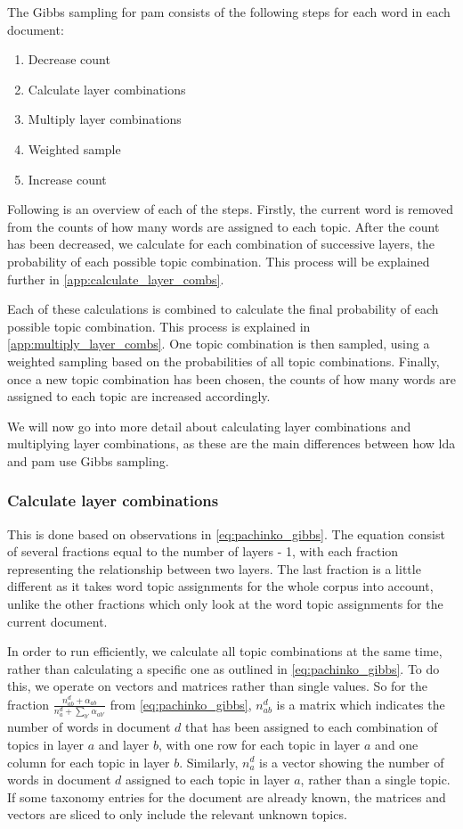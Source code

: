 The Gibbs sampling for \gls{pam} consists of the following steps for each word in each document:

\begin{enumerate}
	\item Decrease count
	\item Calculate layer combinations
	\item Multiply layer combinations
	\item Weighted sample
	\item Increase count
\end{enumerate}

Following is an overview of each of the steps.
Firstly, the current word is removed from the counts of how many words are assigned to each topic.
After the count has been decreased, we calculate for each combination of successive layers, the probability of each possible topic combination.
This process will be explained further in \autoref{app:calculate_layer_combs}.

Each of these calculations is combined to calculate the final probability of each possible topic combination.
This process is explained in \autoref{app:multiply_layer_combs}.
One topic combination is then sampled, using a weighted sampling based on the probabilities of all topic combinations.
Finally, once a new topic combination has been chosen, the counts of how many words are assigned to each topic are increased accordingly.

We will now go into more detail about calculating layer combinations and multiplying layer combinations, as these are the main differences between how \gls{lda} and \gls{pam} use Gibbs sampling.
\subsubsection{Calculate layer combinations}\label{app:calculate_layer_combs}
This is done based on observations in \autoref{eq:pachinko_gibbs}.
The equation consist of several fractions equal to the number of layers - 1, with each fraction representing the relationship between two layers.
The last fraction is a little different as it takes word topic assignments for the whole corpus into account, unlike the other fractions which only look at the word topic assignments for the current document.

In order to run efficiently, we calculate all topic combinations at the same time, rather than calculating a specific one as outlined in \autoref{eq:pachinko_gibbs}.
To do this, we operate on vectors and matrices rather than single values.
So for the fraction $\frac{n_{ab}^d + \alpha_{ab}}{n_a^d + \sum_{b'} \alpha_{ab'}}$ from \autoref{eq:pachinko_gibbs}, $n_{ab}^d$ is a matrix which indicates the number of words in document $d$ that has been assigned to each combination of topics in layer $a$ and layer $b$, with one row for each topic in layer $a$ and one column for each topic in layer $b$.
Similarly, $n_a^d$ is a vector showing the number of words in document $d$ assigned to each topic in layer $a$, rather than a single topic.
If some taxonomy entries for the document are already known, the matrices and vectors are sliced to only include the relevant unknown topics.

